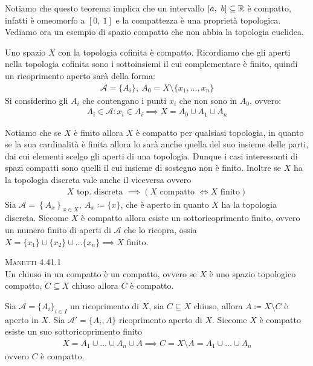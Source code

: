 Notiamo che questo teorema implica che un intervallo $[a,\ b]\subseteq\mathbb{R}$ è compatto, infatti è omeomorfo a $[0,\ 1]$ e la compattezza è una proprietà topologica. \newline
Vediamo ora un esempio di spazio compatto che non abbia la topologia euclidea.
\begin{example}
	Uno spazio $X$ con la topologia cofinita è compatto.\newline 
	Ricordiamo che gli aperti nella topologia cofinita sono i sottoinsiemi il cui complementare è finito, quindi un ricoprimento aperto sarà della forma:
		\begin{gather*}
			\mathcal{A}=\{A_i\}, \ A_0=X\setminus\{x_1,\dots,x_n\}			
		\end{gather*}
	Si considerino gli $A_i$ che contengano i punti $x_i$ che non sono in $A_0$, ovvero:
		\begin{gather*}
			A_i\in\mathcal{A}\colon x_i\in A_i\implies X=A_0\cup A_1\cup A_n
		\end{gather*}
\end{example}

\begin{observe}
Notiamo che se $X$ è finito allora $X$ è compatto per qualsiasi topologia, in quanto se la sua cardinalità è finita allora lo sarà anche quella del suo insieme delle parti, dai cui elementi scelgo gli aperti di una topologia. Dunque i casi interessanti di spazi compatti sono quelli il cui insieme di sostegno non è finito.\newline
Inoltre se $X$ ha la topologia discreta vale anche il viceversa ovvero
	\begin{gather*}
		X \text{ top. discreta } \implies \left( X \text{ compatto } \iff X \text{ finito}\right)
	\end{gather*}
Sia $\mathcal{A}=\left\{ A_x\right\}_{x\in X}, \ A_x\coloneqq \{x\}$, che è aperto in quanto $X$ ha la topologia discreta. Siccome $X$ è compatto allora esiste un sottoricoprimento finito, ovvero un numero finito di aperti di $\mathcal{A}$ che lo ricopra, ossia $X=\{x_1\}\cup\{x_2\}\cup\dots\{x_n\}\implies X$ finito.
\end{observe}

\begin{theorema}\textsc{Manetti 4.41.1} \label{chiuso in compatto}\\
	Un chiuso in un compatto è un compatto, ovvero se $X$ è uno spazio topologico compatto, $C\subseteq X$ chiuso allora $C$ è compatto.
\end{theorema}
\begin{demonstration}
	Sia $\mathcal{A}=\{A_i \}_{i\in I}$ un ricoprimento di $X$, sia $C\subseteq X$ chiuso, allora $A\coloneqq X\setminus C$ è aperto in $X$.\newline
	Sia $\mathcal{A}'=\{A_i, A\}$ ricoprimento aperto di $X$. Siccome $X$ è compatto esiste un suo sottoricoprimento finito 
		\begin{gather*}
			X=A_1\cup\dots\cup A_n\cup A \implies C=X\setminus A=A_1\cup\dots\cup A_n
		\end{gather*}
	ovvero $C$ è compatto.
\end{demonstration}

